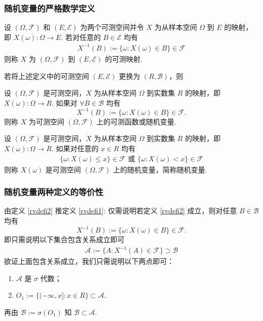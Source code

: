 \begin{frame}
	\frametitle{随机变量的严格数学定义}
	\vspace{-0.1cm}
	\begin{defi}[可测映射] 设 $(\Omega,\mathcal{F})$ 和 $(E,\mathcal{E})$ 为两个可测空间并令 $X$ 为从样本空间 $\Omega$ 到 $E$ 的映射，即 $X (\omega):\Omega\rightarrow E$. 若对任意的 $B\in \mathcal{E}$ 均有
		\begin{eqnarray*}
			X^{-1}(B):=\{\omega: X(\omega)\in B\}\in \mathcal{F}
		\end{eqnarray*}
		则称 $X$ 为 $(\Omega,\mathcal{F})$ 到 $(E,\mathcal{E})$ 的可测映射.
	\end{defi}
	\pause %

	若将上述定义中的可测空间 $(E,\mathcal{E})$ 更换为 $(R,\mathcal{B})$，则 %
	\pause
	\begin{defi}[可测函数或随机变量] \label{rvdefi1}\hspace{-0.2cm} 设 $(\Omega,\mathcal{F})$ 是可测空间，$X$ 为从样本空间 $\Omega$ 到实数集 $R$ 的映射，即 $X (\omega):\Omega\rightarrow R$. 如果对 $\forall B\in \mathcal{B}$ 均有
		\[X^{-1}(B):=\{\omega: X(\omega)\in B\}\in \mathcal{F}.\]%
		则称 $X$ 为可测空间 $(\Omega,\mathcal{F})$ 上的可测函数或随机变量.
	\end{defi}%
	\pause
	\begin{defi}[随机变量的另一定义]\hspace{-0.2cm} \label{rvdefi2} 设 $(\Omega,\mathcal{F})$ 是可测空间，$X$ 为从样本空间 $\Omega$ 到实数集 $R$ 的映射，即 $X (\omega):\Omega\rightarrow R$. 如果对任意的 $x\in R$ 均有
		\begin{eqnarray*}
			\{\omega: X (\omega)\le x\}\in \mathcal{F} \mbox{  或  }      \{\omega: X (\omega)< x\}\in \mathcal{F}
		\end{eqnarray*}
		则称 $X (\omega)$ 是可测空间 $(\Omega,\mathcal{F})$ 上的随机变量，简称随机变量.
	\end{defi}
\end{frame}
\begin{frame}
	\frametitle{随机变量两种定义的等价性}
	由定义 \ref{rvdefi2} 推定义 \ref{rvdefi1}: 仅需说明若定义 \ref{rvdefi2} 成立，则对任意 $B\in\mathcal{B}$ 均有
	$$X^{-1}(B):=\{\omega:X(\omega)\in B\}\in \mathcal{F}.$$
	\pause 即只需说明以下集合包含关系成立即可
	\begin{eqnarray*}
		\mathcal{A}:=\{A:X^{-1}(A)\in \mathcal{F}\}\supset \mathcal{B}
	\end{eqnarray*}
	\pause
	欲证上面包含关系成立，我们只需说明以下两点即可：
	\begin{enumerate}[<+-|alert@+>]
		\item $\mathcal{A}$ 是 $\sigma$ 代数；
		\item $O_1:=\{(-\infty,x]:x\in R\}\subset \mathcal{A}$.
	\end{enumerate}
	\pause 再由 $\mathcal{B}:=\sigma (O_1)$ 知 $\mathcal{B}\subset \mathcal{A}$.
\end{frame}
